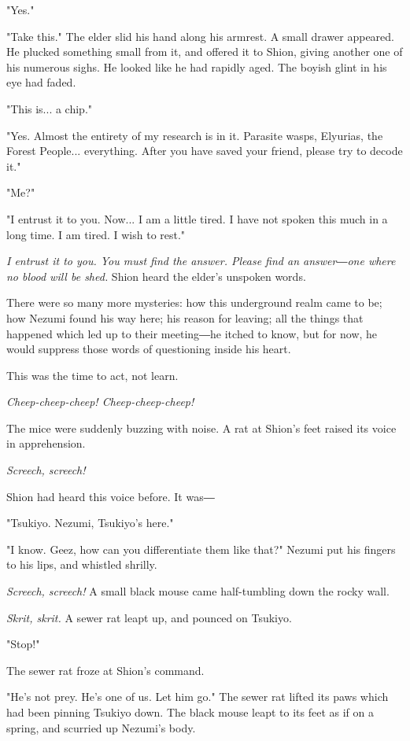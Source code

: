 "Yes."

"Take this." The elder slid his hand along his armrest. A small drawer
appeared. He plucked something small from it, and offered it to Shion,
giving another one of his numerous sighs. He looked like he had rapidly
aged. The boyish glint in his eye had faded.

"This is... a chip."

"Yes. Almost the entirety of my research is in it. Parasite wasps,
Elyurias, the Forest People... everything. After you have saved your
friend, please try to decode it."

"Me?"

"I entrust it to you. Now... I am a little tired. I have not spoken this
much in a long time. I am tired. I wish to rest."

\emph{I entrust it to you. You must find the answer. Please find an answer―one
where no blood will be shed.} Shion heard the elder's unspoken words.

There were so many more mysteries: how this underground realm came to
be; how Nezumi found his way here; his reason for leaving; all the
things that happened which led up to their meeting―he itched to know,
but for now, he would suppress those words of questioning inside his
heart.

This was the time to act, not learn.

\emph{Cheep-cheep-cheep! Cheep-cheep-cheep!}

The mice were suddenly buzzing with noise. A rat at Shion's feet raised
its voice in apprehension.

\emph{Screech, screech!}

Shion had heard this voice before. It was―

"Tsukiyo. Nezumi, Tsukiyo's here."

"I know. Geez, how can you differentiate them like that?" Nezumi put his
fingers to his lips, and whistled shrilly.

\emph{Screech, screech!} A small black mouse came half-tumbling down the rocky
wall.

\emph{Skrit, skrit.} A sewer rat leapt up, and pounced on Tsukiyo.

"Stop!"

The sewer rat froze at Shion's command.

"He's not prey. He's one of us. Let him go." The sewer rat lifted its
paws which had been pinning Tsukiyo down. The black mouse leapt to its
feet as if on a spring, and scurried up Nezumi's body.

